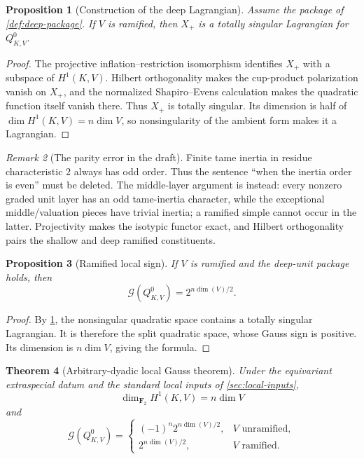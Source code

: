 \documentclass[11pt,reqno]{amsart}
\newtheorem{theorem}{Theorem}[section]
\newtheorem{proposition}[theorem]{Proposition}
\theoremstyle{remark}
\newtheorem{remark}[theorem]{Remark}
\numberwithin{equation}{section}
\newcommand{\F}{\mathbf F}
\newcommand{\Gsum}{\mathcal G}
\begin{document}
\begin{proposition}[Construction of the deep Lagrangian]
\label{prop:deep-lagrangian}
Assume the package of \cref{def:deep-package}.  If \(V\) is ramified,
then \(X_+\) is a totally singular Lagrangian for \(Q^0_{K,V}\).
\end{proposition}

\begin{proof}
The projective inflation--restriction isomorphism identifies \(X_+\) with
a subspace of \(H^1(K,V)\).  Hilbert orthogonality makes the cup-product
polarization vanish on \(X_+\), and the normalized Shapiro--Evens
calculation makes the quadratic function itself vanish there.  Thus
\(X_+\) is totally singular.  Its dimension is half of
\(\dim H^1(K,V)=n\dim V\), so nonsingularity of the ambient form makes it
a Lagrangian.
\end{proof}

\begin{remark}[The parity error in the draft]
Finite tame inertia in residue characteristic \(2\) always has odd order.
Thus the sentence ``when the inertia order is even'' must be deleted.
The middle-layer argument is instead: every nonzero graded unit layer has
an odd tame-inertia character, while the exceptional middle/valuation
pieces have trivial inertia; a ramified simple cannot occur in the latter.
Projectivity makes the isotypic functor exact, and Hilbert orthogonality
pairs the shallow and deep ramified constituents.
\end{remark}

\begin{proposition}[Ramified local sign]\label{prop:ramified-sign}
If \(V\) is ramified and the deep-unit package holds, then
\[
 \Gsum(Q^0_{K,V})=2^{n\dim(V)/2}.
\]
\end{proposition}

\begin{proof}
By \cref{prop:deep-lagrangian}, the nonsingular quadratic space contains a
totally singular Lagrangian.  It is therefore the split quadratic space,
whose Gauss sign is positive.  Its dimension is \(n\dim V\), giving the
formula.
\end{proof}

\begin{theorem}[Arbitrary-dyadic local Gauss theorem]
\label{thm:local-gauss}
Under the equivariant extraspecial datum and the standard local inputs of
\cref{sec:local-inputs},
\[
 \dim_{\F_2}H^1(K,V)=n\dim V
\]
and
\[
 \Gsum(Q^0_{K,V})=
 \begin{cases}
 (-1)^n2^{n\dim(V)/2},&V\text{ unramified},\\
 2^{n\dim(V)/2},&V\text{ ramified}.
 \end{cases}
\]
\end{theorem}
\end{document}
